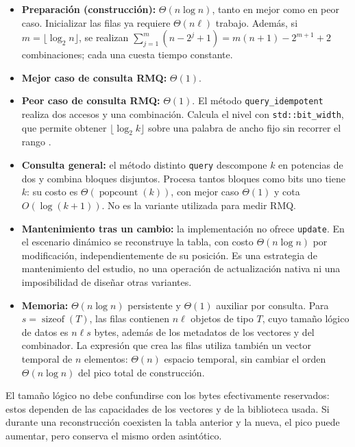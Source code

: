 \begin{itemize}
    \setlength{\itemsep}{2pt}
    \setlength{\parskip}{0pt}
    \item \textbf{Preparación (construcción):} \(\Theta(n\log n)\), tanto
    en mejor como en peor caso. Inicializar las filas ya requiere
    \(\Theta(n\ell)\) trabajo. Además, si
    \(m=\lfloor\log_2 n\rfloor\), se realizan
    \(\sum_{j=1}^{m}(n-2^j+1)=m(n+1)-2^{m+1}+2\)
    combinaciones; cada una cuesta tiempo constante.
    \item \textbf{Mejor caso de consulta RMQ:} \(\Theta(1)\).
    \item \textbf{Peor caso de consulta RMQ:} \(\Theta(1)\). El método
    \texttt{query\_idempotent} realiza dos accesos y una combinación.
    Calcula el nivel con \texttt{std::bit\_width}, que permite obtener
    \(\lfloor\log_2 k\rfloor\) sobre una palabra de ancho fijo sin recorrer
    el rango \cite{cp-sparse-table,cpp-bit-width}.
    \item \textbf{Consulta general:} el método distinto \texttt{query}
    descompone \(k\) en potencias de dos y combina bloques disjuntos.
    Procesa tantos bloques como bits uno tiene \(k\): su costo es
    \(\Theta(\operatorname{popcount}(k))\), con mejor caso \(\Theta(1)\)
    y cota \(O(\log(k+1))\). No es la variante utilizada para medir RMQ.
    \item \textbf{Mantenimiento tras un cambio:} la implementación no ofrece
    \texttt{update}. En el escenario dinámico se reconstruye la tabla,
    con costo \(\Theta(n\log n)\) por modificación, independientemente
    de su posición. Es una estrategia de mantenimiento del estudio, no una
    operación de actualización nativa ni una imposibilidad de diseñar
    otras variantes.
    \item \textbf{Memoria:} \(\Theta(n\log n)\) persistente y
    \(\Theta(1)\) auxiliar por consulta. Para
    \(s=\operatorname{sizeof}(T)\), las filas contienen \(n\ell\) objetos
    de tipo \(T\), cuyo tamaño lógico de datos es \(n\ell s\) bytes,
    además de los metadatos de los vectores y del combinador. La expresión
    que crea las filas utiliza también un vector temporal de \(n\)
    elementos: \(\Theta(n)\) espacio temporal, sin cambiar el orden
    \(\Theta(n\log n)\) del pico total de construcción.
\end{itemize}

El tamaño lógico no debe confundirse con los bytes efectivamente reservados:
estos dependen de las capacidades de los vectores y de la biblioteca usada.
Si durante una reconstrucción coexisten la tabla anterior y la nueva, el pico
puede aumentar, pero conserva el mismo orden asintótico.

